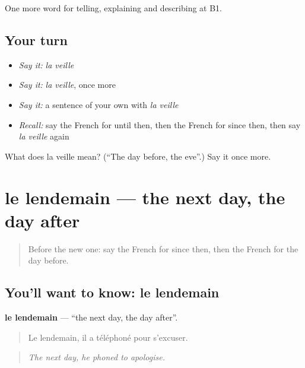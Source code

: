 \begin{grammarlens}[title={What you've built}]
One more word for telling, explaining and describing at B1.
\end{grammarlens}

\subsection*{Your turn}
\begin{itemize}
\raggedright
  \item \emph{Say it:} \emph{la veille}
  \item \emph{Say it:} \emph{la veille}, once more
  \item \emph{Say it:} a sentence of your own with \emph{la veille}
  \item \emph{Recall:} say the French for until then, then the French for since then, then say \emph{la veille} again
\end{itemize}

\begin{tcolorbox}[breakable,colback=teal!4,colframe=teal!35!black,title={Before you move on}]
What does la veille mean? (\textquotedblleft{}The day before, the eve\textquotedblright{}.) Say it once more.
\end{tcolorbox}
\section[le lendemain]{le lendemain — the next day, the day after}

\label{lesson:FR-C273-lendemain}



\begin{quote}
Before the new one: say the French for since then, then the French for the day before.
\end{quote}

\subsection*{You'll want to know: le lendemain}
\textbf{le lendemain} — \textquotedblleft{}the next day, the day after\textquotedblright{}.

\begin{quote}
Le lendemain, il a téléphoné pour s'excuser.
\end{quote}

\begin{quote}
\emph{The next day, he phoned to apologise.}
\end{quote}

